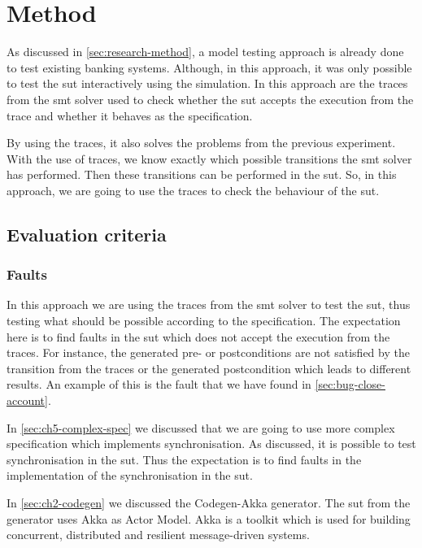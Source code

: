 \section{Method}

As discussed in \autoref{sec:research-method}, a model testing approach is
already done to test existing banking systems. Although, in this approach, it
was only possible to test the \gls{sut} interactively using the simulation. In this
approach are the traces from the \gls{smt} solver used to check whether the
\gls{sut} accepts the execution from the trace and whether it behaves as the
specification.~\cite[p.~5]{stoel_storm_vinju_bosman_2016}

By using the traces, it also solves the problems from the previous experiment.
With the use of traces, we know exactly which possible transitions the
\gls{smt} solver has performed. Then these transitions can be performed in the \gls{sut}.
So, in this approach, we are going to use the traces to check the behaviour of the
\gls{sut}.

\subsection{Evaluation criteria}\label{sec:ch5-eval-criteria}

\subsubsection{Faults}
In this approach we are using the traces from the \gls{smt} solver to test the
\gls{sut}, thus testing what should be possible according to the specification.
The expectation here is to find faults in the \gls{sut} which does not accept the
execution from the traces. For instance, the generated pre- or postconditions
are not satisfied by the transition from the traces or the generated
postcondition which leads to different results. An example of this is the fault
that we have found in \autoref{sec:bug-close-account}.

In \autoref{sec:ch5-complex-spec} we discussed that we are going to use more
complex specification which implements synchronisation. As discussed, it is
possible to test synchronisation in the \gls{sut}. Thus the expectation is to
find faults in the implementation of the synchronisation in the \gls{sut}.

In \autoref{sec:ch2-codegen} we discussed the Codegen-Akka generator. The
\gls{sut} from the generator uses Akka as Actor Model. Akka is a toolkit
which is used for building concurrent, distributed and resilient
message-driven systems.~\cite[p.~4]{roestenburg2016akka}


